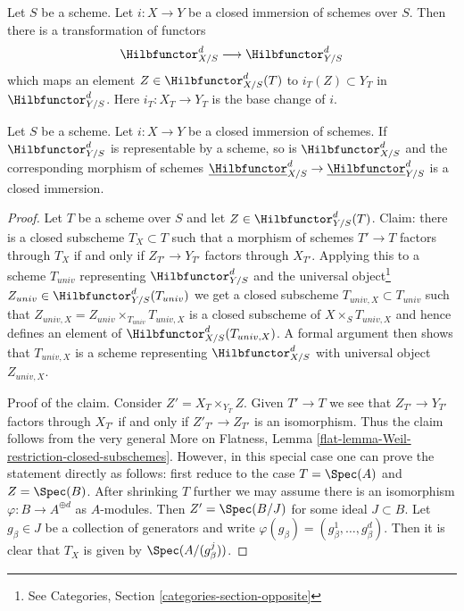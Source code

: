 \noindent
Let $S$ be a scheme. Let $i : X \to Y$ be a closed immersion of schemes
over $S$. Then there is a transformation of functors
$$
\Hilbfunctor^d_{X/S} \longrightarrow \Hilbfunctor^d_{Y/S}
$$
which maps an element $Z \in \Hilbfunctor^d_{X/S}(T)$ to
$i_T(Z) \subset Y_T$ in $\Hilbfunctor^d_{Y/S}$. Here $i_T : X_T \to Y_T$
is the base change of $i$.

\begin{lemma}
\label{lemma-hilb-d-of-closed}
Let $S$ be a scheme. Let $i : X \to Y$ be a closed immersion of schemes.
If $\Hilbfunctor^d_{Y/S}$ is representable by a scheme, so is
$\Hilbfunctor^d_{X/S}$ and the corresponding morphism of schemes
$\underline{\Hilbfunctor}^d_{X/S} \to \underline{\Hilbfunctor}^d_{Y/S}$
is a closed immersion.
\end{lemma}

\begin{proof}
Let $T$ be a scheme over $S$ and let $Z \in \Hilbfunctor^d_{Y/S}(T)$.
Claim: there is a closed subscheme $T_X \subset T$ such
that a morphism of schemes $T' \to T$ factors through $T_X$ if
and only if $Z_{T'} \to Y_{T'}$ factors through $X_{T'}$.
Applying this to a scheme $T_{univ}$ representing $\Hilbfunctor^d_{Y/S}$ and the
universal object\footnote{See
Categories, Section \ref{categories-section-opposite}}
$Z_{univ} \in \Hilbfunctor^d_{Y/S}(T_{univ})$
we get a closed subscheme $T_{univ, X} \subset T_{univ}$ such that
$Z_{univ, X} = Z_{univ} \times_{T_{univ}} T_{univ, X}$
is a closed subscheme of $X \times_S T_{univ, X}$ and hence
defines an element of $\Hilbfunctor^d_{X/S}(T_{univ, X})$.
A formal argument then shows that $T_{univ, X}$ is a scheme
representing $\Hilbfunctor^d_{X/S}$ with universal object $Z_{univ, X}$.

\medskip\noindent
Proof of the claim. Consider $Z' = X_T \times_{Y_T} Z$. Given $T' \to T$
we see that $Z_{T'} \to Y_{T'}$ factors through $X_{T'}$ if and
only if $Z'_{T'} \to Z_{T'}$ is an isomorphism. Thus the claim follows
from the very general
More on Flatness, Lemma \ref{flat-lemma-Weil-restriction-closed-subschemes}.
However, in this special case one can prove the statement directly as
follows: first reduce to the case $T = \Spec(A)$ and $Z = \Spec(B)$.
After shrinking $T$ further we may assume there is an isomorphism
$\varphi : B \to A^{\oplus d}$ as $A$-modules. Then $Z' = \Spec(B/J)$
for some ideal $J \subset B$. Let $g_\beta \in J$ be a collection of
generators and write $\varphi(g_\beta) = (g_\beta^1, \ldots, g_\beta^d)$.
Then it is clear that $T_X$ is given by $\Spec(A/(g_\beta^j))$.
\end{proof}

